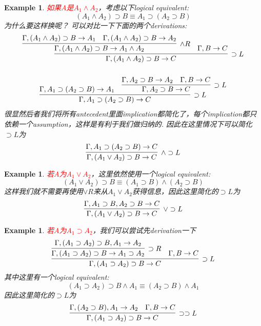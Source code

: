 \documentclass{article}
\theoremstyle{plain}
\newtheorem{example}[theorem]{Example}
\theoremstyle{nonumberplain}
\newcommand{\redt}[1]{\textcolor{red}{#1}}
\begin{document}
\begin{example}
\rm \redt{如果$A$是$A_1 \wedge A_2$}，考虑以下logical equivalent:
$$
(A_1 \wedge A_2) \supset B \equiv A_1 \supset (A_2 \supset B)
$$
为什么要这样换呢？ 可以对比一下下面的两个derivations:
$$
\begin{gathered}
\infer[\supset L]{\Gamma, (A_1 \wedge A_2) \supset B \to C}{\infer[\wedge R]{\Gamma, (A_1 \wedge A_2) \supset B \to A_1 \wedge A_2}{\Gamma, (A_1 \wedge A_2) \supset B \to A_1  & \Gamma, (A_1 \wedge A_2) \supset B \to  A_2} & \Gamma, B \to C} \\\\
\infer[\supset L]{\Gamma,A_1 \supset (A_2 \supset B) \to C}{\Gamma,A_1 \supset (A_2 \supset B) \to A_1 & \infer[\supset L]{\Gamma,A_2 \supset B \to C}{\Gamma, A_2 \supset B \to A_2 &  \Gamma, B \to C}}
\end{gathered}
$$
很显然后者我们将所有antecedent里面implication都简化了，每个implication都只依赖一个assumption，这样是有利于我们做归纳的. 因此在这里情况下可以简化$\supset L$为
$$
\infer[\wedge \supset L]{\Gamma, (A_1 \vee A_2) \supset B \to C}{\Gamma, A_1 \supset (A_2 \supset B) \to C}
$$
\end{example}

\begin{example}
\rm \redt{若$A$为$A_1 \vee A_2$}，这里依然使用一个logical equivalent:
$$
(A_1 \vee A_2) \supset B  \equiv (A_1 \supset B) \wedge (A_2 \supset B)
$$
这样我们就不需要再使用$\vee R$来从$A_1 \vee A_2$获得信息，因此这里简化的$\supset L$为
$$
\infer[\vee \supset L]{\Gamma, (A_1 \vee A_2) \supset B  \to C}{\Gamma, A_1 \supset B, A_2 \supset B \to C}
$$
\end{example}

\begin{example}
\rm \redt{若$A$为$A_1 \supset A_2$}，我们可以尝试先derivation一下
$$
\infer[\supset L]{\Gamma,(A_1 \supset A_2) \supset B \to C}{\infer[\supset R]{\Gamma,(A_1 \supset A_2) \supset B \to A_1 \supset A_2}{\Gamma,(A_1 \supset A_2) \supset B, A_1 \to A_2} & \Gamma, B \to C}
$$
其中这里有一个logical equivalent:
$$
(A_1 \supset A_2) \supset B  \wedge A_1 \equiv (A_2 \supset B) \wedge A_1
$$
因此这里简化的$\supset L$为
$$
\infer[\supset\supset L]{\Gamma,(A_1 \supset A_2) \supset B \to C}{\Gamma, (A_2 \supset B), A_1 \to A_2 & \Gamma, B \to C}
$$
\end{example}
\end{document}
